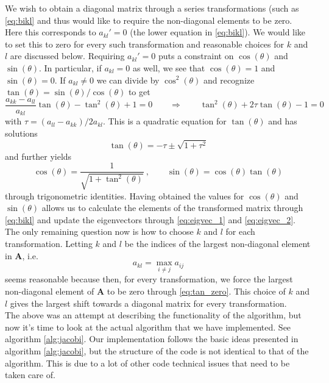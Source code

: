 \documentclass[12pt]{article}
\numberwithin{figure}{section}
\numberwithin{table}{section}
\begin{document}
\noindent We wish to obtain a diagonal matrix through a series transformations (such as \eqref{eq:bikl} and thus would like to require the non-diagonal elements to be zero. Here this corresponds to $a_{kl}'=0$ (the lower equation in \eqref{eq:bikl}). We would like to set this to zero for every such transformation and reasonable choices for $k$ and $l$ are discussed below. Requiring $a_{kl}'=0$ puts a constraint on $\cos(\theta)$ and $\sin(\theta)$. In particular, if $a_{kl}=0$ as well, we see that $\cos(\theta)=1$ and $\sin(\theta)=0$. If $a_{kl}\neq 0$ we can divide by $\cos^2(\theta)$ and recognize $\tan(\theta)=\sin(\theta)/\cos(\theta)$ to get
\begin{equation}
	\frac{a_{kk}-a_{ll}}{a_{kl}}\tan(\theta)-\tan^2(\theta)+1=0 \qquad\Rightarrow\qquad \tan^2(\theta)+2\tau\tan(\theta)-1=0 \label{eq:tan_zero}
\end{equation}
with $\tau=(a_{ll}-a_{kk})/2a_{kl}$. This is a quadratic equation for $\tan(\theta)$ and has solutions
\begin{equation}
	\tan(\theta)=-\tau\pm\sqrt{1+\tau^2}
\end{equation}
and further yields
\begin{equation}
	\cos(\theta)=\frac{1}{\sqrt{1+\tan^2(\theta)}} \ , \qquad \sin(\theta)=\cos(\theta)\tan(\theta)
\end{equation}
through trigonometric identities. Having obtained the values for $\cos(\theta)$ and $\sin(\theta)$ allows us to calculate the elements of the transformed matrix through \eqref{eq:bikl} and update the eigenvectors through \eqref{eq:eigvec_1} and \eqref{eq:eigvec_2}. The only remaining question now is how to choose $k$ and $l$ for each transformation. Letting $k$ and $l$ be the indices of the largest non-diagonal element in $\mathbf{A}$, i.e.
\begin{equation}
	a_{kl}=\max_{i\neq j}a_{ij}
\end{equation}
seems reasonable because then, for every transformation, we force the largest non-diagonal element of $\mathbf{A}$
to be zero through \eqref{eq:tan_zero}. This choice of $k$ and $l$ gives the largest shift towards a diagonal matrix for every transformation. \\

\noindent The above was an attempt at describing the functionality of the algorithm, but now it's time to look at the actual algorithm that we have implemented. See algorithm \ref{alg:jacobi}. Our implementation follows the basic ideas presented in algorithm \ref{alg:jacobi}, but the structure of the code is not identical to that of the algorithm. This is due to a lot of other code technical issues that need to be taken care of.
\end{document}
